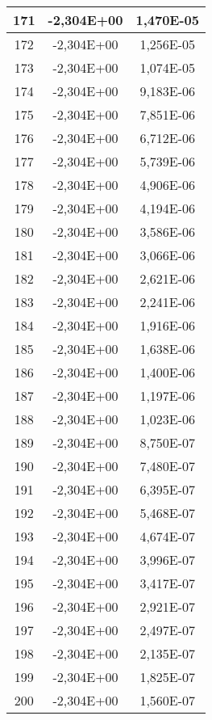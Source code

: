 \documentclass[12pt]{article}
\begin{document}
\begin{center}
\begin{longtable}{|c|c|c|}
    171	&     -2,304E+00	&   1,470E-05 \\ \hline
    172	&     -2,304E+00	&   1,256E-05 \\ \hline
    173	&     -2,304E+00	&   1,074E-05 \\ \hline
    174	&     -2,304E+00	&   9,183E-06 \\ \hline
    175	&     -2,304E+00	&   7,851E-06 \\ \hline
    176	&     -2,304E+00	&   6,712E-06 \\ \hline
    177	&     -2,304E+00	&   5,739E-06 \\ \hline
    178	&     -2,304E+00	&   4,906E-06 \\ \hline
    179	&     -2,304E+00	&   4,194E-06 \\ \hline
    180	&     -2,304E+00	&   3,586E-06 \\ \hline
    181	&     -2,304E+00	&   3,066E-06 \\ \hline
    182	&     -2,304E+00	&   2,621E-06 \\ \hline
    183	&     -2,304E+00	&   2,241E-06 \\ \hline
    184	&     -2,304E+00	&   1,916E-06 \\ \hline
    185	&     -2,304E+00	&   1,638E-06 \\ \hline
    186	&     -2,304E+00	&   1,400E-06 \\ \hline
    187	&     -2,304E+00	&   1,197E-06 \\ \hline
    188	&     -2,304E+00	&   1,023E-06 \\ \hline
    189	&     -2,304E+00	&   8,750E-07 \\ \hline
    190	&     -2,304E+00	&   7,480E-07 \\ \hline
    191	&     -2,304E+00	&   6,395E-07 \\ \hline
    192	&     -2,304E+00	&   5,468E-07 \\ \hline
    193	&     -2,304E+00	&   4,674E-07 \\ \hline
    194	&     -2,304E+00	&   3,996E-07 \\ \hline
    195	&     -2,304E+00	&   3,417E-07 \\ \hline
    196	&     -2,304E+00	&   2,921E-07 \\ \hline
    197	&     -2,304E+00	&   2,497E-07 \\ \hline
    198	&     -2,304E+00	&   2,135E-07 \\ \hline
    199	&     -2,304E+00	&   1,825E-07 \\ \hline
    200	&     -2,304E+00	&   1,560E-07 \\ \hline

\end{longtable}
\end{center}
\end{document}
